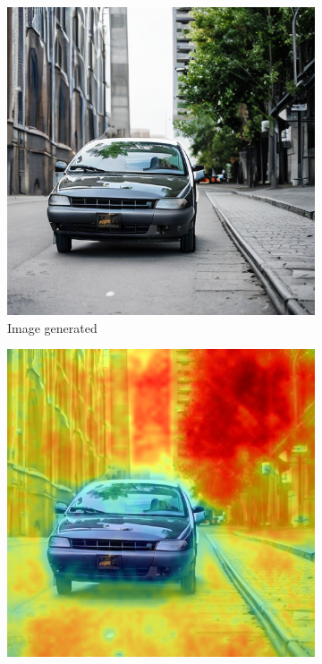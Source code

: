 \begin{figure}
\centering
  \begin{subfigure}{0.32\columnwidth}
   \includegraphics[width=\columnwidth]{img/3-methodology/example_daam.png}
   \caption{Image generated}
   \label{fig:daam-example-image}
  \end{subfigure}
  \begin{subfigure}{0.32\columnwidth}
   \includegraphics[width=\columnwidth]{img/3-methodology/example_daam_heatmap_SoT.png}

\end{subfigure}
\end{figure}
